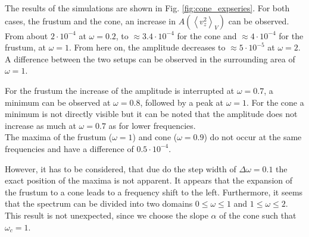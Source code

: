 The results of the simulations are shown in Fig. \ref{fig:cone_expseries}.
For both cases, the frustum and the cone, an increase in $A\left(\left<v^2_z\right>_V\right)$ can be observed.
From  about $2\cdot10^{-4}$ at $\omega=0.2$, to  $\approx 3.4\cdot10^{-4}$ for the cone and $\approx 4\cdot10^{-4}$ for the frustum,  at $\omega=1$.
From here on, the amplitude decreases to $\approx 5\cdot10^{-5}$ at $\omega=2$.
A difference between the two setups can be observed in the surrounding area of $\omega=1$.

For the frustum the increase of the amplitude is interrupted at $\omega=0.7$, a minimum can be observed at $\omega=0.8$, followed by
a peak at $\omega=1$. For the cone a minimum is not directly visible but it can be noted that the
amplitude does not increase as much at $\omega=0.7$ as for lower frequencies.\\
The maxima of the frustum ($\omega=1$) and cone ($\omega=0.9$) do not occur at the same frequencies and have a difference of $0.5\cdot10^{-4}$.

However, it has to be considered, that due do the step width of $\Delta\omega = 0.1$ the exact position of the maxima is not apparent.
It appears that the expansion of the frustum to a cone leads to a frequency shift to the left.
Furthermore, it seems that the spectrum can be divided into two domains $0\leq\omega\leq1$ and $1 \leq \omega\leq 2$.
This result is not unexpected, since we choose the slope $\alpha$ of the cone such that $\omega_c=1$.

\clearpage

